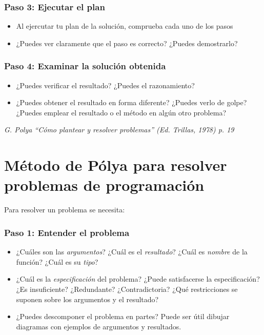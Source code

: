 \subsubsection*{Paso 3: Ejecutar el plan}
\begin{itemize}
\item Al ejercutar tu plan de la solución, comprueba cada uno de los pasos
\item ¿Puedes ver claramente que el paso es correcto? ¿Puedes demostrarlo?
\end{itemize}

\subsubsection*{Paso 4: Examinar la solución obtenida}
\begin{itemize}
\item ¿Puedes verificar el resultado? ¿Puedes el razonamiento?
\item ¿Puedes obtener el resultado en forma diferente? ¿Puedes verlo de golpe?
  ¿Puedes emplear el resultado o el método en algún otro problema?
\end{itemize}

\noindent
\textit{G. Polya ``Cómo plantear y resolver problemas'' (Ed. Trillas, 1978)
  p. 19}

\section{Método de Pólya para resolver problemas de programación}

\noindent Para resolver un problema se necesita:
\subsubsection*{Paso 1: Entender el problema}
\begin{itemize}
\item ¿Cuáles son las \emph{argumentos}? ¿Cuál es el \emph{resultado}? ¿Cuál es
  \emph{nombre} de la función? ¿Cuál es su \emph{tipo}?
\item ¿Cuál es la \emph{especificación} del problema? ¿Puede satisfacerse la
  especificación? ¿Es insuficiente? ¿Redundante? ¿Contradictoria? ¿Qué
  restricciones se suponen sobre los argumentos y el resultado?
\item ¿Puedes descomponer el problema en partes? Puede ser útil dibujar
  diagramas con ejemplos de argumentos y resultados.
\end{itemize}

